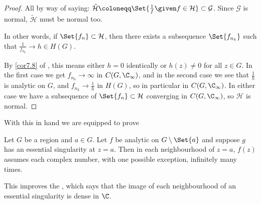 \begin{proof}
	All by way of saying: $\tilde{\mathcal{H}} \coloneqq \Set{\frac{1}{f} \given f \in \mathcal{H}} \subset \mathcal{G}$.
	Since $\mathcal{G}$ is normal, $\tilde{\mathcal{H}}$ must be normal too.

	In other words, if $\Set{f_n} \subset \mathcal{H}$, then there exists a subsequence $\Set{f_{n_k}}$ such that $\frac{1}{f_{n_k}} \to h \in H(G)$.

	By \autoref{cor7.8} of , this means either $h = 0$ identically or $h(z) \neq 0$ for all $z \in G$.
	In the first case we get $f_{n_k} \to \infty$ in $C(G, \C_\infty)$, and in the second case we see that $\frac{1}{h}$ is analytic on $G$, and $f_{n_k} \to \frac{1}{h}$ in $H(G)$, so in particular in $C(G, \C_\infty)$.
	In either case we have a subsequence of $\Set{f_n} \subset \mathcal{H}$ converging in $C(G, \C_\infty)$, so $\mathcal{H}$ is normal.
\end{proof}

With this in hand we are equipped to prove

\begin{theorem}\label{thm9.14}
	Let $G$ be a region and $a \in G$.
	Let $f$ be analytic on $G \setminus \Set{a}$ and suppose $g$ has an essential singularity at $z = a$.
	Then in each neighbourhood of $z = a$, $f(z)$ assumes each complex number, with one possible exception, infinitely many times.
\end{theorem}

\begin{remark}
	This improves the , which says that the image of each neighbourhood of an essential singularity is dense in $\C$.
\end{remark}

